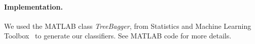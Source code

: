 
\paragraph{Implementation.}
We used the MATLAB class \textit{TreeBagger}, from Statistics and 
Machine Learning Toolbox~\cite{treebagger_matlab} to generate our 
classifiers. 
See MATLAB code for more details.

